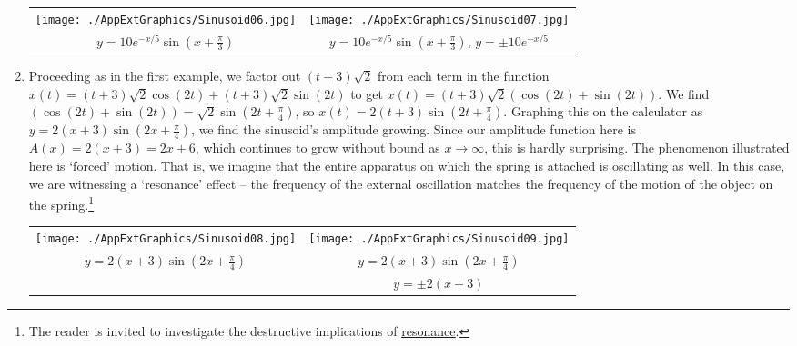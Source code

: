 \begin{ex}
\begin{enumerate}
\begin{center}
\begin{tabular}{cc}

\texttt{[image: ./AppExtGraphics/Sinusoid06.jpg]} &
\hspace{0.25in} \texttt{[image: ./AppExtGraphics/Sinusoid07.jpg]}  \\
 $y = 10e^{-x/5} \sin\left(x + \frac{\pi}{3}\right)$ &
\hspace{0.25in}  $y = 10e^{-x/5} \sin\left(x + \frac{\pi}{3}\right)$, $y = \pm 10e^{-x/5}$ \\

\end{tabular}
\end{center}

\item  Proceeding as in the first example, we factor out $(t+3)\sqrt{2}$ from each term in the function $x(t) = (t+3)\sqrt{2} \cos(2t) + (t+3) \sqrt{2} \sin(2t)$ to get $x(t) = (t+3)\sqrt{2}(\cos(2t) + \sin(2t))$.   We find $(\cos(2t) + \sin(2t)) = \sqrt{2} \sin\left(2t + \frac{\pi}{4}\right)$, so $x(t) = 2(t+3) \sin\left(2t + \frac{\pi}{4}\right)$.  Graphing this on the calculator as $y = 2(x+3) \sin\left(2x + \frac{\pi}{4}\right)$, we find the sinusoid's amplitude growing.  Since our amplitude function here is $A(x) = 2(x+3) = 2x+6$, which continues to grow without bound as $x \rightarrow \infty$, this is hardly surprising.  The phenomenon illustrated here is `forced' motion.  That is, we imagine that the entire apparatus on which the spring is attached is oscillating as well.  In this case, we are witnessing a `resonance' effect -- the frequency of the external oscillation matches the frequency of the motion of the object on the spring.\footnote{The reader is invited to investigate the destructive implications of \href{http://en.wikipedia.org/wiki/Resonance}{\underline{resonance}}.}


\begin{center}

\hspace{.1in} \begin{tabular}{cc}

\texttt{[image: ./AppExtGraphics/Sinusoid08.jpg]} &
\hspace{0.6in}  \texttt{[image: ./AppExtGraphics/Sinusoid09.jpg]}  \\
$y = 2(x+3) \sin\left(2x + \frac{\pi}{4}\right)$ & 
\hspace{0.6in}  $y = 2(x+3) \sin\left(2x + \frac{\pi}{4}\right)$ \\
 & \hspace{0.6in}  $y = \pm 2(x+3)$ \\


\end{tabular}
\end{center}
\end{enumerate}
\end{ex}
